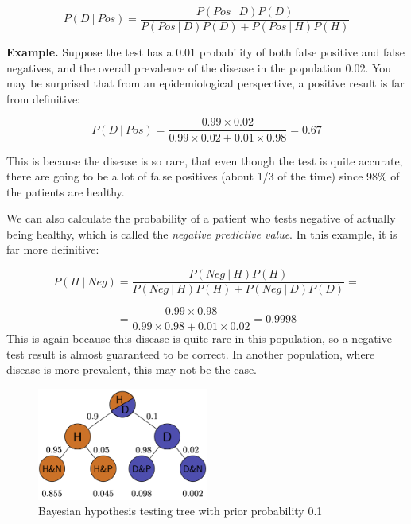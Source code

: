 \documentclass[
  letterpaper,
  DIV=11,
  numbers=noendperiod]{scrreprt}
\begin{document}
\[ P(D  \ \vert \  Pos) =  \frac{P(Pos \ \vert \ D)P(D)}{P(Pos \ \vert \ D) P(D) + P(Pos  \ \vert \  H)P(H)}\]

\textbf{Example.} Suppose the test has a 0.01 probability of both false
positive and false negatives, and the overall prevalence of the disease
in the population 0.02. You may be surprised that from an
epidemiological perspective, a positive result is far from definitive:

\[ P(D  \ \vert \  Pos)  = \frac{0.99 \times 0.02}{0.99 \times 0.02 + 0.01 \times 0.98} = 0.67 \]

This is because the disease is so rare, that even though the test is
quite accurate, there are going to be a lot of false positives (about
1/3 of the time) since 98\% of the patients are healthy.

We can also calculate the probability of a patient who tests negative of
actually being healthy, which is called the \emph{negative predictive
value}. In this example, it is far more definitive:

\[ P(H  \ \vert \  Neg)  = \frac{P(Neg \ \vert \ H)P(H)}{P(Neg \ \vert \ H) P(H) + P(Neg  \ \vert \  D)P(D)} = \]

\[ = \frac{0.99 \times 0.98}{0.99 \times 0.98 + 0.01 \times 0.02} =  0.9998\]
This is again because this disease is quite rare in this population, so
a negative test result is almost guaranteed to be correct. In another
population, where disease is more prevalent, this may not be the case.

\begin{figure}

{\centering \includegraphics[width=0.5\textwidth,height=\textheight]{./images/prob_tree_tikz1.png}

}

\caption{Bayesian hypothesis testing tree with prior probability 0.1}

\end{figure}
\end{document}
